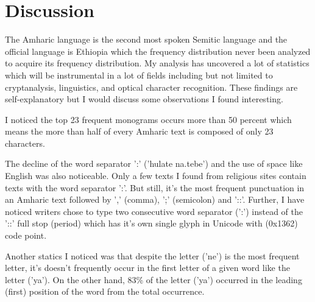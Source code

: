 \section{Discussion}

The Amharic language is the second most spoken  Semitic language and the official language is Ethiopia which the frequency distribution never been analyzed to acquire its frequency distribution. My analysis has uncovered a lot of statistics which will be instrumental in a lot of fields including but not limited to cryptanalysis, linguistics, and optical character recognition. These findings are self-explanatory but I would discuss some observations I found interesting.

I noticed the top 23 frequent monograms occurs more than 50 percent which means the more than half of every Amharic text is composed of only 23 characters.

The decline of the word separator ':' ('\foreignlanguage{ethiop}{hulate na.tebe}') and the use of space like English was also noticeable. Only a few texts I found from religious sites contain texts with the word separator ':'. But still, it's the most frequent punctuation in an Amharic text followed by '\foreignlanguage{ethiop}{,}' (comma),  '\foreignlanguage{ethiop}{;}' (semicolon) and '\foreignlanguage{ethiop}{::}'. Further, I have noticed writers chose to type two consecutive word separator (':') instead of the '\foreignlanguage{ethiop}{::}' full stop (period) which has it's own single glyph in Unicode with (0x1362) code point.

Another statics I noticed was that despite the letter ('\foreignlanguage{ethiop}{ne}') is the most frequent letter,  it's doesn't frequently occur in the first letter of a given word like the letter ('\foreignlanguage{ethiop}{ya}'). On the other hand, 83\% of the letter ('\foreignlanguage{ethiop}{ya}') occurred in the leading (first) position of the word from the total occurrence.
